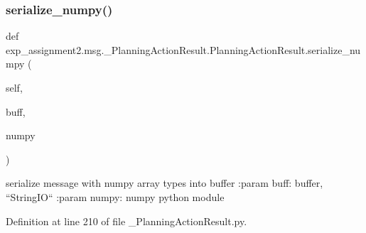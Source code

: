\subsubsection{\texorpdfstring{serialize\+\_\+numpy()}{serialize\_numpy()}}
{\footnotesize\ttfamily def exp\+\_\+assignment2.\+msg.\+\_\+\+Planning\+Action\+Result.\+Planning\+Action\+Result.\+serialize\+\_\+numpy (\begin{DoxyParamCaption}\item[{}]{self,  }\item[{}]{buff,  }\item[{}]{numpy }\end{DoxyParamCaption})}

\begin{DoxyVerb}serialize message with numpy array types into buffer
:param buff: buffer, ``StringIO``
:param numpy: numpy python module
\end{DoxyVerb}
 

Definition at line 210 of file \+\_\+\+Planning\+Action\+Result.\+py.


